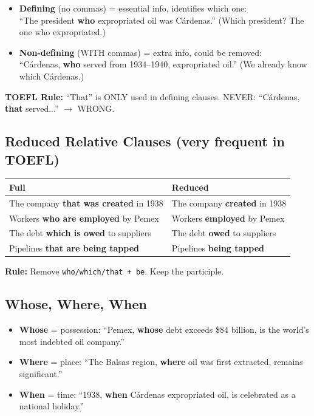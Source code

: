 \documentclass[10pt,a4paper]{article}
\begin{document}
\begin{itemize}[nosep]
\item \textbf{Defining} (no commas) = essential info, identifies which one:\\
``The president \textbf{who} expropriated oil was C\'ardenas.''
(Which president? The one who expropriated.)
\item \textbf{Non-defining} (WITH commas) = extra info, could be removed:\\
``C\'ardenas, \textbf{who} served from 1934--1940, expropriated oil.''
(We already know which C\'ardenas.)
\end{itemize}

\textbf{TOEFL Rule:} ``That'' is ONLY used in defining clauses.
NEVER: ``C\'ardenas, \textbf{that} served...'' $\to$ WRONG.

\subsection*{Reduced Relative Clauses (very frequent in TOEFL)}

\begin{center}
\begin{tabular}{ll}
\toprule
\textbf{Full} & \textbf{Reduced} \\
\midrule
The company \textbf{that was created} in 1938 & The company \textbf{created} in 1938 \\
Workers \textbf{who are employed} by Pemex & Workers \textbf{employed} by Pemex \\
The debt \textbf{which is owed} to suppliers & The debt \textbf{owed} to suppliers \\
Pipelines \textbf{that are being tapped} & Pipelines \textbf{being tapped} \\
\bottomrule
\end{tabular}
\end{center}

\textbf{Rule:} Remove \texttt{who/which/that + be}. Keep the participle.

\subsection*{Whose, Where, When}

\begin{itemize}[nosep]
\item \textbf{Whose} = possession: ``Pemex, \textbf{whose} debt
exceeds \$84 billion, is the world's most indebted oil company.''
\item \textbf{Where} = place: ``The Balsas region, \textbf{where}
oil was first extracted, remains significant.''
\item \textbf{When} = time: ``1938, \textbf{when} C\'ardenas
expropriated oil, is celebrated as a national holiday.''
\end{itemize}
\end{document}
